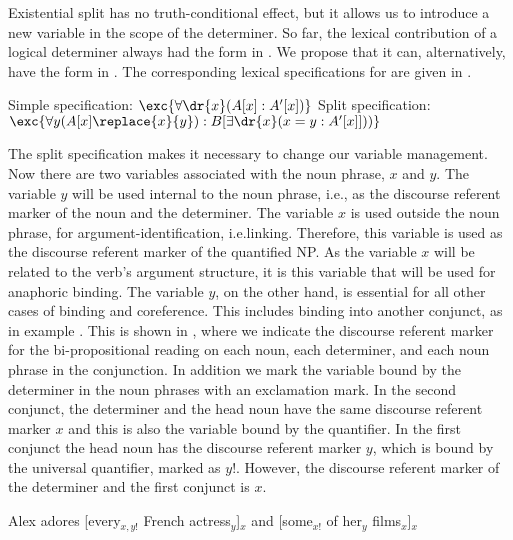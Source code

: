 \documentclass[output=paper]{langsci/langscibook}
\begin{document}
Existential split has no truth-conditional effect, but it allows us to introduce a new variable in the scope of the determiner.
So far, the lexical contribution of a logical determiner always had the form in . We propose that it can, alternatively, have the form in . 
The corresponding lexical specifications for  are given in .

\ea \label{le-every-split}
\begin{xlist}
\ex Simple specification: $\exc{\forall \dr{x} (A[x] : A'[x])}$
\ex Split specification: \label{def-every-split}
$\exc{\forall y (A[x]\replace{x}{y}) : B[\exists \dr{x} (x = y : A'[x]]))}$
\end{xlist}
\z 

The split specification makes it necessary to change our variable management. 
Now there are two variables associated with the noun phrase, $x$ and $y$. The variable $y$ will be used internal to the noun phrase, i.e., as the discourse referent marker of the noun and the determiner. The variable $x$ is used outside the noun phrase, for argument-identification, i.e.\@ linking. Therefore, this variable is used as the discourse referent marker of the quantified NP. As the variable $x$ will be related to the verb's argument structure, it is this variable that will be used for anaphoric binding. 
The variable $y$, on the other hand, is essential for all other cases of binding and coreference.
This includes binding into another conjunct, as in example . 
This is shown in , where we indicate the discourse referent marker for the bi-propositional reading on each noun,  each determiner, and each noun phrase in the conjunction. 
In addition we mark the variable bound by the determiner in the noun phrases with an exclamation mark.
In the second conjunct, the determiner  and the head noun 
have the same discourse referent marker $x$ and this is also the variable bound by the quantifier. 
In the first conjunct the head noun has the discourse referent marker $y$, which is bound by the universal quantifier, marked as $y!$. However, the discourse referent marker of the determiner and the first conjunct is $x$.


\ea \label{split-actress-dr}
Alex adores [every$_{x,y!}$ French actress$_y$]$_x$ and [some$_{x!}$ of her$_y$ films$_x$]$_x$
\z 
\end{document}

